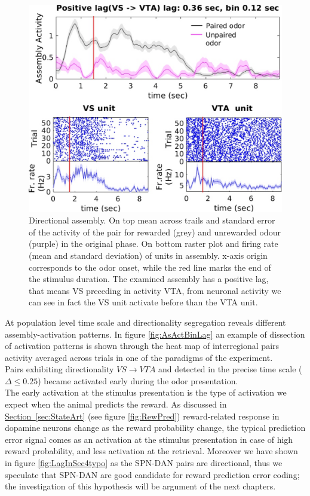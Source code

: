 \begin{figure}
    \centering
    \includegraphics[scale=0.6]{figures/DirectionalAsEx1.pdf}
    \caption{Directional assembly. On top mean across trails and standard error of the activity of the pair for rewarded (grey) and unrewarded odour (purple) in the original phase. On bottom raster plot and firing rate (mean and standard deviation) of units in assembly. x-axis origin corresponds to the odor onset, while the red line marks the end of the stimulus duration. The examined assembly has a positive lag, that means VS preceding in activity VTA, from neuronal activity we can see in fact the VS unit activate before than the VTA unit.}
    \label{fig:directional_assembly}
\end{figure}
At population level time scale and directionality segregation reveals different assembly-activation patterns. In figure \ref{fig:AsActBinLag} an example of dissection of activation patterns is shown through the heat map of interregional pairs activity averaged across trials in one of the paradigms of the experiment.\\Pairs exhibiting directionality $VS \rightarrow VTA$ and detected in the precise time scale ($\Delta \le 0.25$) became activated early during the odor presentation.\\The early activation at the stimulus presentation is the type of activation we expect when the animal predicts the reward. As discussed in \hyperref[sec:StateArt]{Section~\ref*{sec:StateArt}} (see figure \ref{fig:RewPred}) reward-related response in dopamine neurons change as the reward probability change, the typical prediction error signal comes as an activation at the stimulus presentation in case of high reward probability, and less activation at the retrieval. Moreover we have shown in figure \ref{fig:LagInSec4typo} as the SPN-DAN pairs are directional, thus we speculate that SPN-DAN are good candidate for reward prediction error coding; the investigation of this hypothesis will be argument of the next chapters.\\

